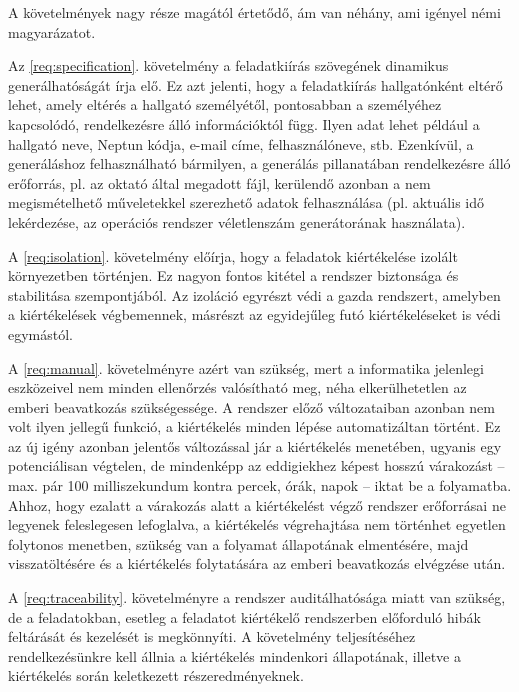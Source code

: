 A követelmények nagy része magától értetődő, ám van néhány, ami igényel némi magyarázatot.

Az \ref{req:specification}. követelmény a feladatkiírás szövegének dinamikus generálhatóságát írja elő.
Ez azt jelenti, hogy a feladatkiírás hallgatónként eltérő lehet, amely eltérés a hallgató személyétől, pontosabban a személyéhez kapcsolódó, rendelkezésre álló információktól függ.
Ilyen adat lehet például a hallgató neve, Neptun kódja, e-mail címe, felhasználóneve, stb.
Ezenkívül, a generáláshoz felhasználható bármilyen, a generálás pillanatában rendelkezésre álló erőforrás, pl. az oktató által megadott fájl, kerülendő azonban a nem megismételhető műveletekkel szerezhető adatok felhasználása (pl. aktuális idő lekérdezése, az operációs rendszer véletlenszám generátorának használata).

A \ref{req:isolation}. követelmény előírja, hogy a feladatok kiértékelése izolált környezetben történjen.
Ez nagyon fontos kitétel a rendszer biztonsága és stabilitása szempontjából.
Az izoláció egyrészt védi a gazda rendszert, amelyben a kiértékelések végbemennek, másrészt az egyidejűleg futó kiértékeléseket is védi egymástól.

A \ref{req:manual}. követelményre azért van szükség, mert a informatika jelenlegi eszközeivel nem minden ellenőrzés valósítható meg, néha elkerülhetetlen az emberi beavatkozás szükségessége.
A rendszer előző változataiban azonban nem volt ilyen jellegű funkció, a kiértékelés minden lépése automatizáltan történt.
Ez az új igény azonban jelentős változással jár a kiértékelés menetében, ugyanis egy potenciálisan végtelen, de mindenképp az eddigiekhez képest hosszú várakozást -- max. pár 100 milliszekundum kontra percek, órák, napok -- iktat be a folyamatba.
Ahhoz, hogy ezalatt a várakozás alatt a kiértékelést végző rendszer erőforrásai ne legyenek feleslegesen lefoglalva, a kiértékelés végrehajtása nem történhet egyetlen folytonos menetben, szükség van a folyamat állapotának elmentésére, majd visszatöltésére és a kiértékelés folytatására az emberi beavatkozás elvégzése után.

A \ref{req:traceability}. követelményre a rendszer auditálhatósága miatt van szükség, de a feladatokban, esetleg a feladatot kiértékelő rendszerben előforduló hibák feltárását és kezelését is megkönnyíti.
A követelmény teljesítéséhez rendelkezésünkre kell állnia a kiértékelés mindenkori állapotának, illetve a kiértékelés során keletkezett részeredményeknek.

